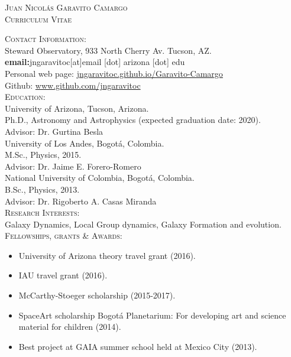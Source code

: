 \documentclass[letterpaper]{article}
\begin{document}
\begin{center}
\textsc{\LARGE Juan Nicol\'as Garavito Camargo}\\
\textsc{\large Curriculum Vitae}\\
\end{center}

\textsc{\Large Contact Information:}\\

Steward Observatory, 933 North Cherry Av. Tucson, AZ.\\
\indent \textbf{email:}jngaravitoc[at]email [dot] arizona [dot] edu\\
\indent Personal web page:
\url{jngaravitoc.github.io/Garavito-Camargo}\\
\indent Github: \url{www.github.com/jngaravitoc} \\

\textsc{\Large Education:}\\

University of Arizona, Tucson, Arizona.\\
\indent Ph.D., Astronomy and Astrophysics (expected
graduation date: 2020).\\
\indent Advisor: Dr. Gurtina Besla\\

University of Los Andes, Bogot\'a, Colombia.\\
\indent M.Sc., Physics, 2015.\\
\indent Advisor: Dr. Jaime E. Forero-Romero\\

National University of Colombia, Bogot\'a, Colombia.\\
\indent B.Sc., Physics, 2013.\\
\indent Advisor: Dr. Rigoberto A. Casas Miranda\\

\textsc{\Large Research Interests:}\\

Galaxy Dynamics, Local Group dynamics, Galaxy Formation and evolution.\\


\textsc{\Large Fellowships, grants \& Awards:}\\
\begin{itemize}
\setlength\itemsep{0em}
\item University of Arizona theory travel grant (2016). \\
\item IAU travel grant (2016).\\
\item McCarthy-Stoeger scholarship (2015-2017).\\
\item SpaceArt scholarship Bogot\'a Planetarium: For developing art and science material for children (2014). \\
\item Best project at GAIA summer school held at Mexico City (2013).\\
\end{itemize}
\end{document}
